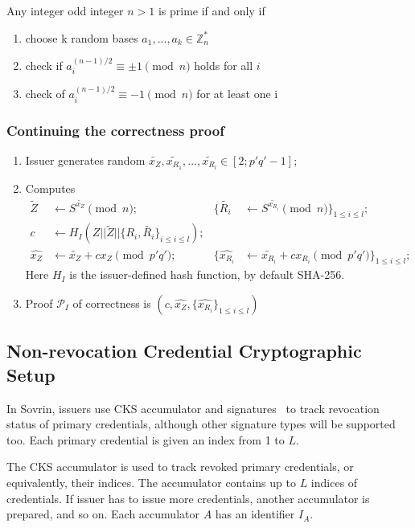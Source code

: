Any integer odd  integer $n > 1$ is prime if and only if
\begin{enumerate}
    \item choose k random bases $a_1,...,a_k \in \mathbb{Z}^{*}_n$
    \item check if $a_i^{(n-1)/2} \equiv \pm 1 \pmod{n}$ holds for all $i$
    \item check of $a_i^{(n-1)/2} \equiv -1 \pmod{n}$ for at least one i
\end{enumerate}

\subsubsection{Continuing the correctness proof}
\begin{enumerate}
\item Issuer generates random $\widetilde{x_Z}, \widetilde{x_{R_1}},\ldots,\widetilde{x_{R_l}}\in [2; p'q'-1]$;
\item Computes 
\begin{align}
\widetilde{Z}& \leftarrow S^{\widetilde{x_Z}}\pmod{n};& \{\widetilde{R_i} &
\leftarrow S^{\widetilde{x_{R_i}}}\pmod{n}\}_{1\leq i \leq l};\\
c &\leftarrow H_I(Z||\widetilde{Z}||\{R_i,\widetilde{R_i}\}_{i\leq i \leq l});\\
\widehat{x_Z}& \leftarrow \widetilde{x_Z}+c x_Z \pmod{p'q'};&
\{\widehat{x_{R_i}}&\leftarrow \widetilde{x_{R_i}}+c x_{R_i}\pmod{p'q'}\}_{1\leq i \leq l};
\end{align}
Here $H_I$ is the issuer-defined hash function, by default SHA-256.

\item Proof $\mathcal{P}_I$ of correctness is $(c,\widehat{x_Z},\{\widehat{x_{R_i}}\}_{1 \leq i \leq l})$
\end{enumerate}
\subsection{Non-revocation Credential Cryptographic Setup}
In Sovrin, issuers use CKS accumulator and signatures~\cite{CamenischKS09} to track revocation status of primary credentials, although other signature types will be supported too. Each primary credential is given an index from 1 to $L$.

The CKS  accumulator is used to track revoked primary credentials, or equivalently, their indices. The accumulator contains up to $L$ indices of credentials. If issuer has to issue more credentials, another accumulator is prepared, and so on. Each accumulator $A$ has an identifier $I_A$.

